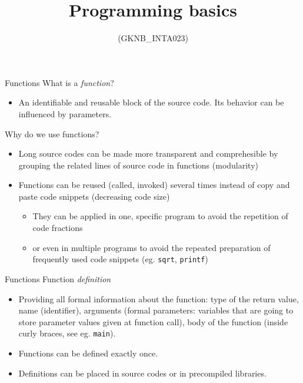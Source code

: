 \documentclass[usenames,dvipsnames,aspectratio=169]{beamer}
\title[Lecture 6.]{Programming basics}
\subtitle{(GKNB\_INTA023)}
\begin{document}
\begin{frame}[plain]
  \titlepage
\end{frame}

\begin{frame}{Functions}
  What is a \emph{function}?
  \begin{itemize}
    \item[] An identifiable and reusable block of the source code. Its behavior can be influenced by parameters.
  \end{itemize}
  Why do we use functions?
  \begin{itemize}
    \item Long source codes can be made more transparent and comprehesible by grouping the related lines of source code in functions (modularity)
    \item Functions can be reused (called, invoked) several times instead of copy and paste code snippets (decreasing code size)
    \begin{itemize}
      \item They can be applied in one, specific program to avoid the repetition of code fractions
      \item or even in multiple programs to avoid the repeated preparation of frequently used code snippets (eg. \texttt{sqrt}, \texttt{printf})
    \end{itemize}
  \end{itemize}
\end{frame}

\begin{frame}{Functions}
  Function \emph{definition}
  \begin{itemize}
    \item Providing all formal information about the function: type of the return value, name (identifier), arguments (formal parameters: variables that are going to store parameter values given at function call), body of the function (inside curly braces, see eg. \texttt{main}).
    \item Functions can be defined exactly once.
    \item Definitions can be placed in source codes or in precompiled libraries.
  \end{itemize}
  \begin{exampleblock}{}
    \small
    
  \end{exampleblock}
\end{frame}
\end{document}
